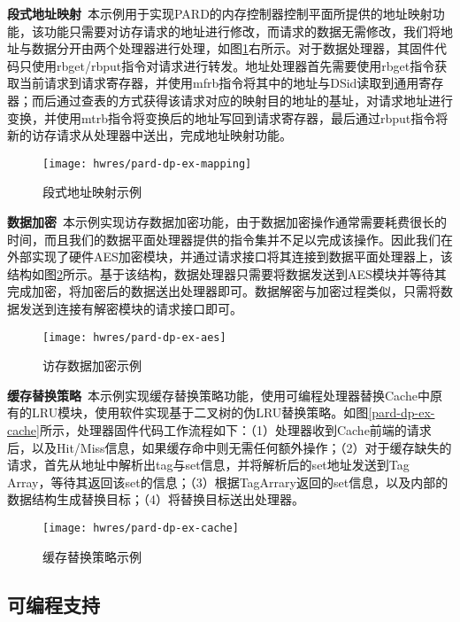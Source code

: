 \textbf{段式地址映射}\ 本示例用于实现PARD的内存控制器控制平面所提供的地址映射功能，该功能只需要对访存请求的地址进行修改，而请求的数据无需修改，我们将地址与数据分开由两个处理器进行处理，如图\ref{fig:pard-dp-ex-mapping}右所示。对于数据处理器，其固件代码只使用rbget/rbput指令对请求进行转发。地址处理器首先需要使用rbget指令获取当前请求到请求寄存器，并使用mfrb指令将其中的地址与DSid读取到通用寄存器；而后通过查表的方式获得该请求对应的映射目的地址的基址，对请求地址进行变换，并使用mtrb指令将变换后的地址写回到请求寄存器，最后通过rbput指令将新的访存请求从处理器中送出，完成地址映射功能。

\begin{figure}[H]
  \centering
  \texttt{[image: hwres/pard-dp-ex-mapping]}
  \caption{段式地址映射示例}
  \label{fig:pard-dp-ex-mapping}
\end{figure}
 
\textbf{数据加密}\ 本示例实现访存数据加密功能，由于数据加密操作通常需要耗费很长的时间，而且我们的数据平面处理器提供的指令集并不足以完成该操作。因此我们在外部实现了硬件AES加密模块，并通过请求接口将其连接到数据平面处理器上，该结构如图\ref{fig:pard-dp-ex-aes}所示。基于该结构，数据处理器只需要将数据发送到AES模块并等待其完成加密，将加密后的数据送出处理器即可。数据解密与加密过程类似，只需将数据发送到连接有解密模块的请求接口即可。

\begin{figure}[H]
  \centering
  \texttt{[image: hwres/pard-dp-ex-aes]}
  \caption{访存数据加密示例}
  \label{fig:pard-dp-ex-aes}
\end{figure}
 
\textbf{缓存替换策略}\ 本示例实现缓存替换策略功能，使用可编程处理器替换Cache中原有的LRU模块，使用软件实现基于二叉树的伪LRU替换策略。如图\ref{pard-dp-ex-cache}所示，处理器固件代码工作流程如下：（1）处理器收到Cache前端的请求后，以及Hit/Miss信息，如果缓存命中则无需任何额外操作；（2）对于缓存缺失的请求，首先从地址中解析出tag与set信息，并将解析后的set地址发送到Tag Array，等待其返回该set的信息；（3）根据TagArrary返回的set信息，以及内部的数据结构生成替换目标；（4）将替换目标送出处理器。

\begin{figure}[H]
  \centering
  \texttt{[image: hwres/pard-dp-ex-cache]}
  \caption{缓存替换策略示例}
  \label{fig:pard-dp-ex-cache}
\end{figure}


\subsection{可编程支持}


